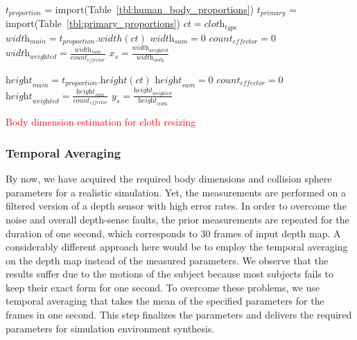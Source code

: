 \documentclass[number,preprint,review,12pt]{elsarticle}
\begin{document}
\begin{algorithm}
\DontPrintSemicolon 
{}
$t_\textit{proportion}$ = {\textrm import}({\textrm Table~\ref{tbl:human_body_proportions}}) \;
$t_\textit{primary}$ = {\color{red} {\textrm import}({\textrm Table~\ref{tbl:primary_proportions}}) \;}
$ct=\textit{cloth}_\textit{type}$\;
$\textit{width}_\textit{main}=t_\textit{proportion}.width(ct)$\;
$\textit{width}_\textit{sum}=0$\;
$\textit{count}_\textit{effector}=0$\;
$\textit{width}_\textit{weighted}=\frac{\textit{width}_\textit{sum}}{\textit{count}_{\textit{effector}}}$\;
$x_s=\frac{\textit{width}_\textit{weighted}}{\textit{width}_\textit{cloth}}$\;

$\textit{height}_\textit{main}=t_\textit{proportion}.\textit{height}(ct)$\;
$\textit{height}_\textit{sum}=0$\;
$\textit{count}_\textit{effector}=0$\;
$\textit{height}_\textit{weighted}=\frac{\textit{height}_\textit{sum}}{\textit{count}_{\textit{effector}}}$\;
$y_s=\frac{\textit{height}_\textit{weighted}}{\textit{height}_\textit{cloth}}$\;
\caption{\textcolor{red}{Body dimension estimation for cloth resizing}}
\label{algo:cloth_resize}
\end{algorithm}


\doublespacing

{\color{red}
\subsubsection{Temporal Averaging}
\label{subsec:4.3} 
}

By now, we have acquired the required body dimensions and collision sphere parameters for a realistic simulation. 
Yet, the measurements are performed on a filtered version of a depth sensor with high error rates. In order to overcome the noise and overall depth-sense faults,  the prior measurements are repeated for the duration of one second, which corresponds to 30 frames of input depth map. A considerably different approach here would be to employ the temporal averaging on the depth map instead of the measured parameters. We observe that the results suffer due to the motions of the subject because most subjects fails to keep their exact form for one second. 
To overcome these problems, we use temporal averaging that takes the mean of the specified parameters for the frames in one second. This step finalizes the parameters and delivers the required parameters for simulation environment synthesis. 
\end{document}
